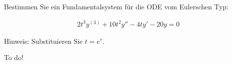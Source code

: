 \begin{exercise}
  Bestimmen Sie ein Fundamentalsystem für die ODE vom Eulerschen Typ:

  \begin{align*}
    2t^3 y^{(3)} + 10t^2 y''- 4ty'- 20y = 0
  \end{align*}

  Hinweis: Substituieren Sie $t = e^\tau$.
\end{exercise}

\begin{solution}
  To do!
\end{solution}
